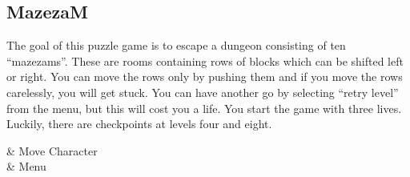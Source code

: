 \subsection{MazezaM}

The goal of this puzzle game is to escape a dungeon consisting of ten
``mazezams''.
These are rooms containing rows of blocks which can be shifted left or
right.
You can move the rows only by pushing them and if you move the rows
carelessly, you will get stuck.
You can have another go by selecting ``retry level'' from the menu,
but this will cost you a life.
You start the game with three lives.
Luckily, there are checkpoints at levels four and eight.

\begin{btnmap}
        &
    Move Character
    \\

        &
    Menu
    \\
\end{btnmap}
